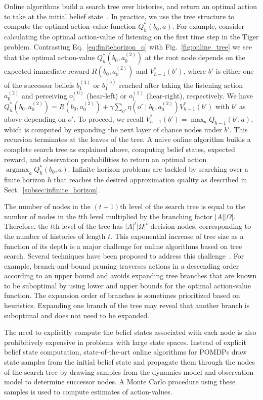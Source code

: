 \documentclass[journal]{IEEEtran}
\DeclareMathOperator*{\argmax}{argmax}
\begin{document}
Online algorithms build a search tree over histories, and return an
optimal action to take at the initial belief
state~\cite{ross2008online}.  In practice, {we use} the
tree structure to compute the optimal action-value
function $Q_h^*(b_0,a)$.  For example, {consider calculating the optimal action-value of listening on the first time step in the Tiger problem.}
Contrasting
Eq.~\eqref{eq:finitehorizon_q} with Fig.~\ref{fig:online_tree} we
see that the optimal action-value $Q_h^*(b_0, a_0^{(2)})$ at the root node
depends on the expected immediate reward $R(b_0,a_0^{(2)})$ and
$V_{h-1}^*(b')$, where $b'$ is either one of the successor beliefs
$b_1^{(4)}$ or $b_1^{(5)}$ reached after taking the listening action $a_0^{(2)}$ and perceiving $o_1^{(0)}$ (hear-left) or $o_1^{(1)}$ (hear-right), respectively.
We have $Q_h^*(b_0,a_0^{(2)}) = R(b_0,a_0^{(2)}) + \gamma\sum_{o'}\eta(o'\mid b_0, a_0^{(2)})V_{h-1}^*(b')$ with $b'$ as above depending on $o'$.
To proceed, we recall $V_{h-1}^*(b') = \max_a Q_{h-1}(b',a)$, which is computed by expanding the next layer of chance nodes under $b'$.
This recursion terminates at the leaves of the tree.
A naive online algorithm builds a complete search tree as explained
above, computing belief states, expected {reward}, and observation
probabilities to return an optimal
action $\argmax_a Q_h^*(b_0,a)$.  Infinite horizon problems are
tackled by searching over a finite horizon $h$ that reaches the
desired approximation quality as described in
Sect.~\ref{subsec:infinite_horizon}.

{The number of nodes in the $(t+1)$th level of the search tree is equal to the number of nodes in the $t$th level multiplied by the branching factor $|A||\Omega|$. Therefore, the }
$t$th level of the tree has $|A|^t|\Omega|^t$ decision nodes,
corresponding to the number of histories of
length $t$.
This exponential increase of tree size as {a} function of its
depth is a major challenge for online algorithms based on tree search.
Several techniques have been proposed to address this
challenge~\cite{ross2008online}.  For example, branch-and-bound
pruning {traverses actions in a descending order according to an upper bound and}
avoids expanding tree branches that are known to be
suboptimal by using lower and upper bounds for the optimal
action-value function.  {The expansion order of branches is sometimes prioritized based on
heuristics.}  Expanding one branch of the tree may reveal
that another branch is suboptimal and does not need to be expanded.

The need to explicitly compute the belief states associated with each node is also prohibitively expensive in problems with large state spaces.
Instead of explicit belief state computation, state-of-the-art online algorithms for POMDPs draw state samples from the
initial belief state and propagate them through the nodes of the
search tree by drawing samples from the dynamics model and
observation model to determine successor nodes.
{A Monte Carlo procedure using these samples is used to compute estimates of
action-values.}
\end{document}
